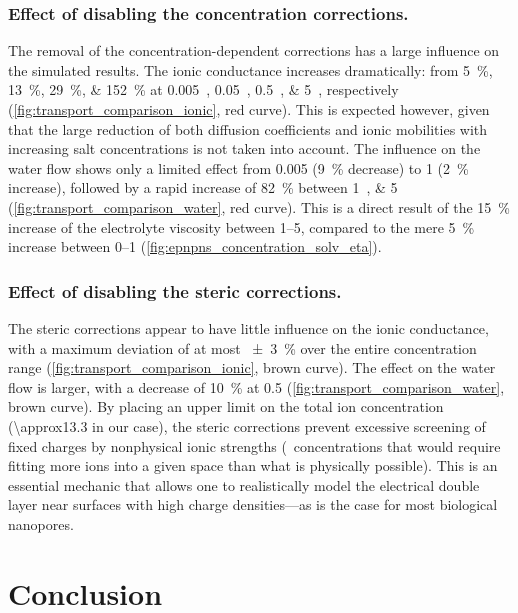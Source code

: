 %
\subsubsection{Effect of disabling the concentration corrections.}
%

The removal of the concentration-dependent corrections has a large influence on the simulated results. The
ionic conductance increases dramatically: from \SIlist{5;13;29;152}{\percent} at
\SIlist{0.005;0.05;0.5;5}{\Molar}, respectively (\cref{fig:transport_comparison_ionic}, red curve). This is
expected however, given that the large reduction of both diffusion coefficients and ionic mobilities with
increasing salt concentrations is not taken into account. The influence on the water flow shows only a limited
effect from \SI{0.005}{\Molar} (\SI{9}{\percent} decrease) to \SI{1}{\Molar} (\SI{2}{\percent} increase),
followed by a rapid increase of \SI{82}{\percent} between \SIlist{1;5}{\Molar}
(\cref{fig:transport_comparison_water}, red curve). This is a direct result of the \SI{15}{\percent} increase
of the electrolyte viscosity between \SIrange{1}{5}{\Molar}, compared to the mere \SI{5}{\percent} increase
between \SIrange{0}{1}{\Molar} (\cref{fig:epnpns_concentration_solv_eta}).

%
\subsubsection{Effect of disabling the steric corrections.}
%
The steric corrections appear to have little influence on the ionic conductance, with a maximum deviation of
at most \SI{\pm3}{\percent} over the entire concentration range (\cref{fig:transport_comparison_ionic}, brown
curve). The effect on the water flow is larger, with a decrease of \SI{10}{\percent} at \SI{0.5}{\Molar}
(\cref{fig:transport_comparison_water}, brown curve). By placing an upper limit on the total ion concentration
(\SI{\approx13.3}{\Molar} in our case), the steric corrections prevent excessive screening of fixed charges by
nonphysical ionic strengths (\ie~concentrations that would require fitting more ions into a given space than
what is physically possible). This is an essential mechanic that allows one to realistically model the
electrical double layer near surfaces with high charge densities---as is the case for most biological
nanopores.


\section{Conclusion}
%
\label{sec:transport:conclusion}
%

